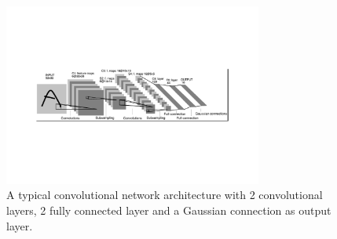 \begin{figure}
\centering
\includegraphics[trim=4cm 5cm 4cm 5cm, clip=true, height=60mm]{Chapter2/typical_architecture.pdf}
\caption{A typical convolutional network architecture with 2 convolutional layers, 2 fully connected layer and a Gaussian connection as output layer.}
\end{figure}






